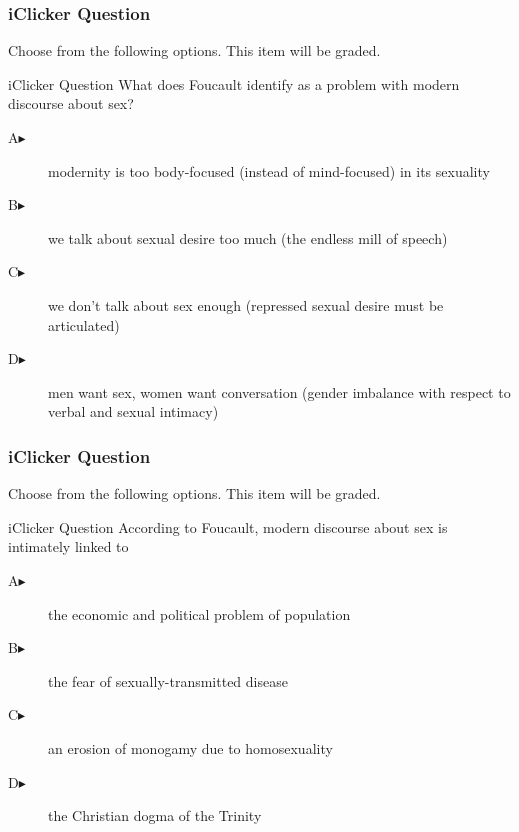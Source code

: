 \documentclass[xcolor=dvipsnames]{beamer}
\begin{document}
\begin{frame}
  \frametitle{iClicker Question}
Choose from the following options. This item will be graded.
\begin{block}{iClicker Question}
What does Foucault identify as a problem with modern discourse about sex?
\end{block}
\begin{description}
\item[A\hspace{.2in}$\blacktriangleright$] modernity is too
  body-focused (instead of mind-focused) in its sexuality
\item[B\hspace{.2in}$\blacktriangleright$] we talk about sexual desire too much
  (the endless mill of speech)
\item[C\hspace{.2in}$\blacktriangleright$] we don't talk about sex
  enough (repressed sexual desire must be articulated)
\item[D\hspace{.2in}$\blacktriangleright$] men want sex, women want
  conversation (gender imbalance with respect to verbal and sexual
  intimacy)
\end{description}
\end{frame}

\begin{frame}
  \frametitle{iClicker Question}
Choose from the following options. This item will be graded.
\begin{block}{iClicker Question}
According to Foucault, modern discourse about sex is intimately linked to
\end{block}
\begin{description}
\item[A\hspace{.2in}$\blacktriangleright$] the economic and political problem of population
\item[B\hspace{.2in}$\blacktriangleright$] the fear of sexually-transmitted disease
\item[C\hspace{.2in}$\blacktriangleright$] an erosion of monogamy due to homosexuality
\item[D\hspace{.2in}$\blacktriangleright$] the Christian dogma of the Trinity
\end{description}
\end{frame}
\end{document}
